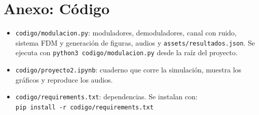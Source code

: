 \documentclass[11pt,a4paper]{article}
\numberwithin{equation}{section}
\begin{document}
\section{Anexo: Código}
\begin{itemize}
  \item \texttt{codigo/modulacion.py}: moduladores, demoduladores, canal con ruido, sistema FDM y generación de figuras, audios y \texttt{assets/resultados.json}. Se ejecuta con \texttt{python3 codigo/modulacion.py} desde la raíz del proyecto.
  \item \texttt{codigo/proyecto2.ipynb}: cuaderno que corre la simulación, muestra los gráficos y reproduce los audios.
  \item \texttt{codigo/requirements.txt}: dependencias. Se instalan con:\\
  \hspace*{1em}\texttt{pip install -r codigo/requirements.txt}
\end{itemize}
\end{document}
